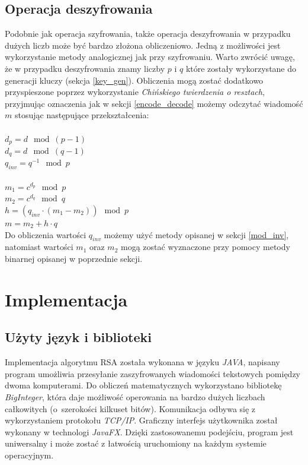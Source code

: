 \documentclass[10pt,a4paper]{article}
\begin{document}
\subsection{Operacja deszyfrowania}

Podobnie jak operacja szyfrowania, także operacja deszyfrowania w przypadku dużych liczb może być bardzo złożona obliczeniowo. Jedną z możliwości jest wykorzystanie metody analogicznej jak przy szyfrowaniu. Warto zwrócić uwagę, że w przypadku deszyfrowania znamy liczby $p$ i $q$ które zostały wykorzystane do generacji kluczy (sekcja \ref{key_gen}). Obliczenia mogą zostać dodatkowo przyspieszone poprzez wykorzystanie \textit{Chińskiego twierdzenia o resztach}, przyjmując oznaczenia jak w sekcji \ref{encode_decode} możemy odczytać wiadomość $m$ stosując następujące przekształcenia:\\
\\
$d_p = d \mod (p-1)$\\ 
$d_q = d \mod (q-1)$\\
$q_{inv} = q^{-1} \mod p$\\ \\ 
$m_1 = c^{d_p} \mod p$\\
$m_2 = c^{d_q} \mod q$\\
$h = (q_{inv} \cdot (m_1 - m_2)) \mod p$\\
$m = m_2 + h \cdot q$\\

Do obliczenia wartości $q_{inv}$ możemy użyć metody opisanej w sekcji \ref{mod_inv}, natomiast wartości $m_1$ oraz $m_2$ mogą zostać wyznaczone przy pomocy metody binarnej opisanej w poprzednie sekcji.


\section{Implementacja}
\subsection{Użyty język i biblioteki}

Implementacja algorytmu RSA została wykonana w języku \textit{JAVA}, napisany program umożliwia przesyłanie zaszyfrowanych wiadomości tekstowych pomiędzy dwoma komputerami. Do obliczeń matematycznych wykorzystano bibliotekę \textit{BigInteger}, która daje możliwość operowania na bardzo dużych liczbach całkowitych (o~szerokości kilkuset bitów). Komunikacja odbywa się z wykorzystaniem protokołu \textit{TCP/IP}. Graficzny interfejs użytkownika został wykonany w technologi \textit{JavaFX}. Dzięki zastosowanemu podejściu, program jest uniwersalny i może zostać z łatwością uruchomiony na każdym systemie operacyjnym. 
\end{document}
